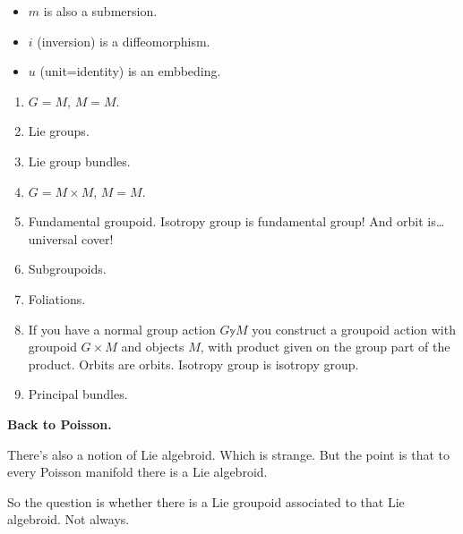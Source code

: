 \begin{proposition}
\begin{itemize}
\item \(m\) is also a submersion.
\item \(i\) (inversion) is a diffeomorphism.
\item  \(u\) (unit=identity) is an embbeding.
\end{itemize}
\end{proposition}


\begin{example}
\begin{enumerate}
\item \(G=M\),  \(M=M\).
 \item Lie groups.
	\item Lie group bundles.
\item \(G=M \times M\), \(M =M\).
 \item Fundamental groupoid. Isotropy group is fundamental group! And orbit is…\clearpage universal cover!
\item Subgroupoids.
\item  Foliations.
\item If you have a normal group action \(G \mathbb{y} M\) you construct a groupoid action with groupoid \(G \times M\) and objects \(M\), with product given on the group part of the product. Orbits are orbits. Isotropy group is isotropy group.
 \item Principal bundles.
\end{enumerate}
\end{example}

{\bf Back to Poisson.}

There's also a notion of Lie algebroid. Which is strange. But the point is that to every Poisson manifold there is a Lie algebroid.

So the question is whether there is a Lie groupoid associated to that Lie algebroid. Not always.

